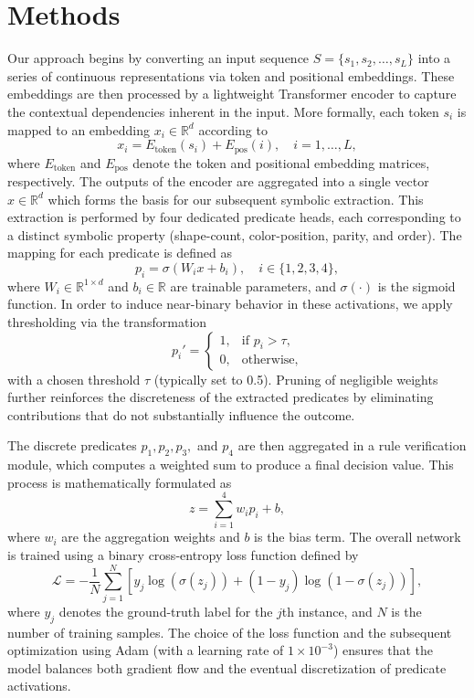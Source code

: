 \documentclass{article}
\begin{document}
\section{Methods}
Our approach begins by converting an input sequence \(S = \{s_1, s_2, \ldots, s_L\}\) into a series of continuous representations via token and positional embeddings. These embeddings are then processed by a lightweight Transformer encoder to capture the contextual dependencies inherent in the input. More formally, each token \(s_i\) is mapped to an embedding \(x_i \in \mathbb{R}^d\) according to
\[
x_i = E_\text{token}(s_i) + E_\text{pos}(i), \quad i = 1, \ldots, L,
\]
where \(E_\text{token}\) and \(E_\text{pos}\) denote the token and positional embedding matrices, respectively. The outputs of the encoder are aggregated into a single vector \(x \in \mathbb{R}^d\) which forms the basis for our subsequent symbolic extraction. This extraction is performed by four dedicated predicate heads, each corresponding to a distinct symbolic property (shape-count, color-position, parity, and order). The mapping for each predicate is defined as
\[
p_i = \sigma(W_i x + b_i), \quad i \in \{1,2,3,4\},
\]
where \(W_i \in \mathbb{R}^{1 \times d}\) and \(b_i \in \mathbb{R}\) are trainable parameters, and \(\sigma(\cdot)\) is the sigmoid function. In order to induce near-binary behavior in these activations, we apply thresholding via the transformation
\[
p_i' = 
\begin{cases}
1, & \text{if } p_i > \tau, \\
0, & \text{otherwise,}
\end{cases}
\]
with a chosen threshold \(\tau\) (typically set to 0.5). Pruning of negligible weights further reinforces the discreteness of the extracted predicates by eliminating contributions that do not substantially influence the outcome.

The discrete predicates \(p_1, p_2, p_3,\) and \(p_4\) are then aggregated in a rule verification module, which computes a weighted sum to produce a final decision value. This process is mathematically formulated as
\[
z = \sum_{i=1}^4 w_i p_i + b,
\]
where \(w_i\) are the aggregation weights and \(b\) is the bias term. The overall network is trained using a binary cross-entropy loss function defined by
\[
\mathcal{L} = -\frac{1}{N} \sum_{j=1}^{N} \left[ y_j \log(\sigma(z_j)) + (1-y_j) \log(1-\sigma(z_j)) \right],
\]
where \(y_j\) denotes the ground-truth label for the \(j\)th instance, and \(N\) is the number of training samples. The choice of the loss function and the subsequent optimization using Adam (with a learning rate of \(1 \times 10^{-3}\)) ensures that the model balances both gradient flow and the eventual discretization of predicate activations.
\end{document}
